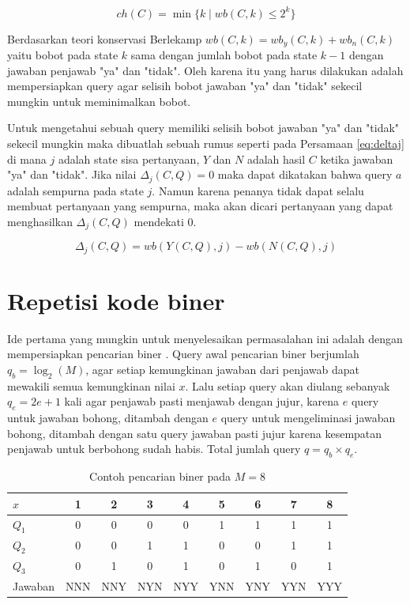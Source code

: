 \begin{equation} \label{eq:character}
ch(C) = \min\{k \mid wb(C,k) \leq 2^k\}
\end{equation}

Berdasarkan teori konservasi Berlekamp \cite{Deppe2004} $wb(C,k) = wb_y(C,k) + wb_n(C,k)$ yaitu bobot pada state $k$ sama dengan jumlah bobot pada state $k-1$ dengan jawaban penjawab "ya" dan "tidak". Oleh karena itu yang harus dilakukan adalah mempersiapkan query agar selisih bobot jawaban "ya" dan "tidak" sekecil mungkin untuk meminimalkan bobot.

Untuk mengetahui sebuah query memiliki selisih bobot jawaban "ya" dan "tidak" sekecil mungkin maka dibuatlah sebuah rumus seperti pada Persamaan \ref{eq:deltaj} di mana $j$ adalah state sisa pertanyaan, $Y$ dan $N$ adalah hasil $C$ ketika jawaban "ya" dan "tidak". Jika nilai $\Delta_j(C,Q) = 0$ maka dapat dikatakan bahwa query $a$ adalah sempurna pada state $j$. Namun karena penanya tidak dapat selalu membuat pertanyaan yang sempurna, maka akan dicari pertanyaan yang dapat menghasilkan $\Delta_j(C,Q)$ mendekati $0$.

\begin{equation}
\label{eq:deltaj}
\Delta_j(C,Q) = wb(Y(C,Q),j) - wb(N(C,Q),j)
\end{equation}


\section{Repetisi kode biner}

Ide pertama yang mungkin untuk menyelesaikan permasalahan ini adalah dengan mempersiapkan pencarian biner \cite{VanLint2016}. Query awal pencarian biner berjumlah $q_b=\log_2(M)$, agar setiap kemungkinan jawaban dari penjawab dapat mewakili semua kemungkinan nilai $x$. Lalu setiap query akan diulang sebanyak $q_e=2e+1$ kali agar penjawab pasti menjawab dengan jujur, karena $e$ query untuk jawaban bohong, ditambah dengan $e$ query untuk mengeliminasi jawaban bohong, ditambah dengan satu query jawaban pasti jujur karena kesempatan penjawab untuk berbohong sudah habis. Total jumlah query $q=q_b \times q_e$.

\begin{table}[h!]
\caption{Contoh pencarian biner pada $M=8$}
\label{tab:binary_8}
\begin{center}
\begin{tabular}{|l|c|c|c|c|c|c|c|c|}
\hline
$x$  & 1 & 2 & 3 & 4 & 5 & 6 & 7 & 8 \\
\hline
$Q_1$ & 0 & 0 & 0 & 0 & 1 & 1 & 1 & 1 \\
\hline
$Q_2$ & 0 & 0 & 1 & 1 & 0 & 0 & 1 & 1 \\
\hline
$Q_3$ & 0 & 1 & 0 & 1 & 0 & 1 & 0 & 1 \\
\hline
Jawaban & NNN & NNY & NYN & NYY & YNN & YNY & YYN & YYY \\
\hline
\end{tabular}
\end{center}
\end{table}

